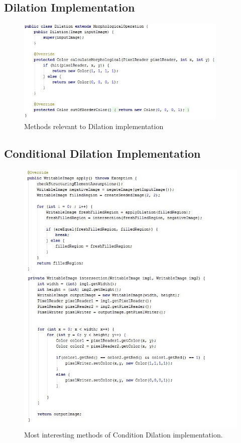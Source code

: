 \documentclass{article}
\begin{document}
%
%
\subsection{Dilation Implementation} \label{dilation_impl}
\begin{figure}[H]
	\centering
	\includegraphics[width=0.9\textwidth]{_Figures/code/dilation.jpg}
    \caption{Methods relevant to Dilation implementation}
    \label{fig:code:dilation}
\end{figure}

\newpage
%
%
\subsection{Conditional Dilation Implementation} \label{cond_dil_impl}
\begin{figure}[H]
	\centering
	\includegraphics[width=1\textwidth]{_Figures/code/cond_dilation.jpg}
    \caption{Most interesting methods of Condition Dilation implementation.}
    \label{fig:code:dilation}
\end{figure}
\end{document}
